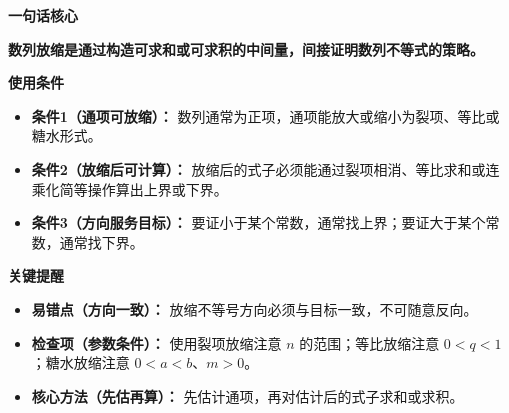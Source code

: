 \begin{summarybox}
	\textbf{\textcolor{CSummary}{一句话核心}}

	\textbf{数列放缩是通过构造可求和或可求积的中间量，间接证明数列不等式的策略。}

	\medskip
	\textbf{\textcolor{CSummary}{使用条件}}
	\begin{itemize}[leftmargin=*, itemsep=0.5em, topsep=0.4em]
		\item \textbf{条件1（通项可放缩）：} 数列通常为正项，通项能放大或缩小为裂项、等比或糖水形式。
		\item \textbf{条件2（放缩后可计算）：} 放缩后的式子必须能通过裂项相消、等比求和或连乘化简等操作算出上界或下界。
		\item \textbf{条件3（方向服务目标）：} 要证小于某个常数，通常找上界；要证大于某个常数，通常找下界。
	\end{itemize}

	\medskip
	\textbf{\textcolor{CSummary}{关键提醒}}
	\begin{itemize}[leftmargin=*, itemsep=0.5em, topsep=0.4em]
		\item \textbf{易错点（方向一致）：} 放缩不等号方向必须与目标一致，不可随意反向。
		\item \textbf{检查项（参数条件）：} 使用裂项放缩注意 $n$ 的范围；等比放缩注意 $0<q<1$；糖水放缩注意 $0<a<b$、$m>0$。
		\item \textbf{核心方法（先估再算）：} 先估计通项，再对估计后的式子求和或求积。
	\end{itemize}
\end{summarybox}
